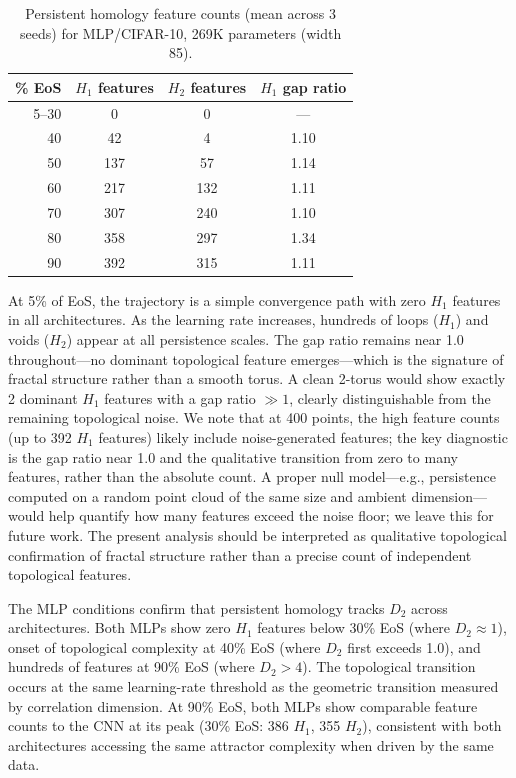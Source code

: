 \documentclass[aps,prl,twocolumn,superscriptaddress]{revtex4-2}
\begin{document}
\begin{table}[h]
\caption{\label{tab:tda_mlp85}%
Persistent homology feature counts (mean across 3 seeds) for MLP/CIFAR-10, 269K parameters (width 85).}
\begin{ruledtabular}
\begin{tabular}{rccc}
\% EoS & $H_1$ features & $H_2$ features & $H_1$ gap ratio\\
\hline
5--30 & 0 & 0 & ---\\
40 & 42 & 4 & 1.10\\
50 & 137 & 57 & 1.14\\
60 & 217 & 132 & 1.11\\
70 & 307 & 240 & 1.10\\
80 & 358 & 297 & 1.34\\
90 & 392 & 315 & 1.11\\
\end{tabular}
\end{ruledtabular}
\end{table}

At 5\% of EoS, the trajectory is a simple convergence path with zero $H_1$ features in all architectures. As the learning rate increases, hundreds of loops ($H_1$) and voids ($H_2$) appear at all persistence scales. The gap ratio remains near 1.0 throughout---no dominant topological feature emerges---which is the signature of fractal structure rather than a smooth torus. A clean 2-torus would show exactly 2 dominant $H_1$ features with a gap ratio $\gg 1$, clearly distinguishable from the remaining topological noise. We note that at 400 points, the high feature counts (up to 392 $H_1$ features) likely include noise-generated features; the key diagnostic is the gap ratio near 1.0 and the qualitative transition from zero to many features, rather than the absolute count. A proper null model---e.g., persistence computed on a random point cloud of the same size and ambient dimension---would help quantify how many features exceed the noise floor; we leave this for future work. The present analysis should be interpreted as qualitative topological confirmation of fractal structure rather than a precise count of independent topological features.

The MLP conditions confirm that persistent homology tracks $D_2$ across architectures. Both MLPs show zero $H_1$ features below 30\% EoS (where $D_2 \approx 1$), onset of topological complexity at 40\% EoS (where $D_2$ first exceeds 1.0), and hundreds of features at 90\% EoS (where $D_2 > 4$). The topological transition occurs at the same learning-rate threshold as the geometric transition measured by correlation dimension. At 90\% EoS, both MLPs show comparable feature counts to the CNN at its peak (30\% EoS: 386 $H_1$, 355 $H_2$), consistent with both architectures accessing the same attractor complexity when driven by the same data.
\end{document}
